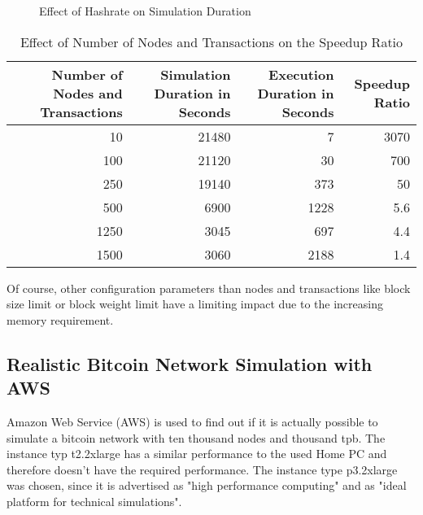 \begin{figure}
\centering
{}
\caption{Effect of Hashrate on Simulation Duration\label{figure:limitations2}}
\end{figure}

\begin{table}[ht]
\caption{Effect of Number of Nodes and Transactions on the Speedup Ratio \label{table:limitations}}
\centering
\begin{adjustbox}{width=1\textwidth}
    \begin{tabular}{| r | r | r | r |}
    \hline
    \textbf{Number of Nodes and Transactions} & \textbf{Simulation Duration in Seconds} & \textbf{Execution Duration in Seconds} & \textbf{Speedup Ratio} \\ \hline
    10 & 21480 & 7 & 3070 \\ \hline
    100 & 21120 & 30 & 700 \\ \hline
    250 & 19140 & 373 & 50 \\ \hline
    500 & 6900 & 1228 & 5.6 \\ \hline
    1250 & 3045 & 697 & 4.4 \\ \hline
    1500 & 3060 & 2188 & 1.4 \\\hline
    \end{tabular}
\end{adjustbox}
\end{table}

Of course, other configuration parameters than nodes and transactions like block size limit or block weight limit have a limiting impact due to the increasing memory requirement.

\subsection{Realistic Bitcoin Network Simulation with AWS}

Amazon Web Service (AWS) is used to find out if it is actually possible to simulate a bitcoin network with ten thousand nodes and thousand tpb. The instance typ t2.2xlarge has a similar performance to the used Home PC and therefore doesn't have the required performance. The instance type p3.2xlarge was chosen, since it is advertised as "high performance computing" and as "ideal platform for technical simulations".


